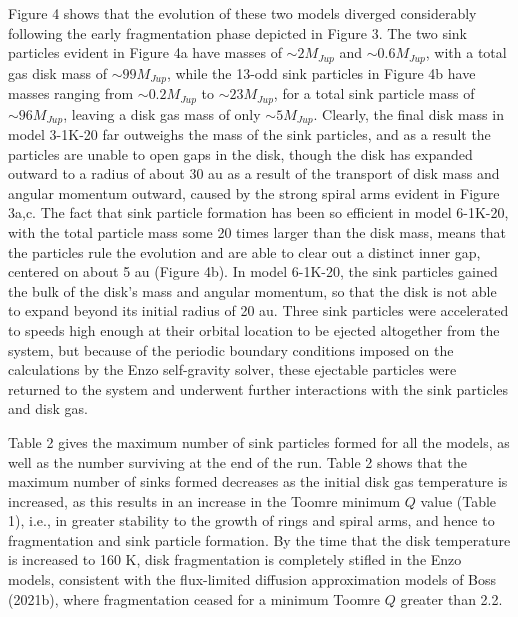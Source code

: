 \documentclass[12pt,preprint]{aastex}
\begin{document}
 Figure 4 shows that the evolution of these two models diverged considerably
following the early fragmentation phase depicted in Figure 3. The two sink
particles evident in Figure 4a have masses of $\sim 2 M_{Jup}$ and 
$\sim 0.6 M_{Jup}$, with a total gas disk mass of $\sim 99 M_{Jup}$,
while the 13-odd sink particles in Figure 4b have masses
ranging from $\sim 0.2 M_{Jup}$ to $\sim 23 M_{Jup}$, for a total sink particle
mass of $\sim 96 M_{Jup}$, leaving a disk gas mass of only $\sim 5 M_{Jup}$.
Clearly, the final disk mass in model 3-1K-20 far outweighs the mass of
the sink particles, and as a result the particles are unable to open gaps
in the disk, though the disk has expanded outward to a radius of about 30 au
as a result of the transport of disk mass and angular momentum outward,
caused by the strong spiral arms evident in Figure 3a,c. The fact that sink
particle formation has been so efficient in model 6-1K-20, with the total particle
mass some 20 times larger than the disk mass, means that the particles
rule the evolution and are able to clear out a distinct inner gap, centered
on about 5 au (Figure 4b). In model 6-1K-20, the sink particles gained the
bulk of the disk's mass and angular momentum, so that the disk is not
able to expand beyond its initial radius of 20 au. Three sink particles were
accelerated to speeds high enough at their orbital location to be ejected
altogether from the system, but because of the periodic boundary conditions
imposed on the calculations by the Enzo self-gravity solver, these ejectable
particles were returned to the system and underwent further interactions with the
sink particles and disk gas.

 Table 2 gives the maximum number of sink particles formed for all the 
models, as well as the number surviving at the end of the run. 
Table 2 shows that the maximum number of sinks formed decreases as
the initial disk gas temperature is increased, as this results in an increase
in the Toomre minimum $Q$ value (Table 1), i.e., in greater stability to the 
growth of rings and spiral arms, and hence to fragmentation and sink
particle formation. By the time that the disk temperature is increased to 160 K,
disk fragmentation is completely stifled in the Enzo models, consistent
with the flux-limited diffusion approximation models of Boss (2021b), 
where fragmentation ceased for a minimum Toomre $Q$ greater than 2.2.
\end{document}
